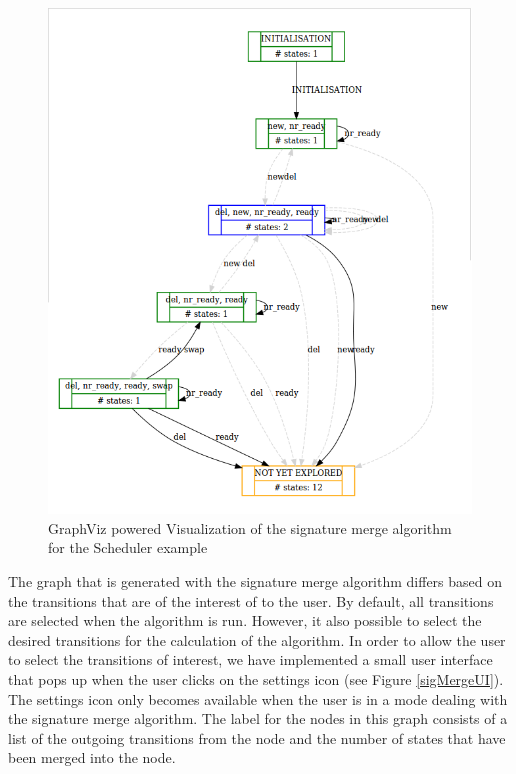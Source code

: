 \begin{center}
\begin{figure}[h!]
\centering
\includegraphics[width=14cm]{bilder/dotty-sigmerge.png}
\caption{GraphViz powered Visualization of the signature merge algorithm for the Scheduler example}
\label{sigmergeDotty}
\end{figure}
\end{center}


The graph that is generated with the signature merge algorithm differs based on the transitions that are of the interest of to the user. By default, all transitions are selected when the algorithm is run. However, it also possible to select the desired transitions for the calculation of the algorithm. In order to allow the user to select the transitions of interest, we have implemented a small user interface that pops up when the user clicks on the settings icon (see Figure \ref{sigMergeUI}). The settings icon only becomes available when the user is in a mode dealing with the signature merge algorithm. The label for the nodes in this graph consists of a list of the outgoing transitions from the node and the number of states that have been merged into the node.  

